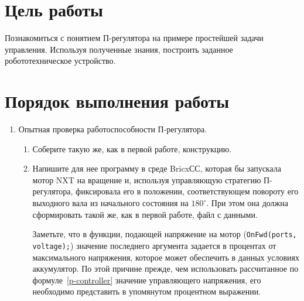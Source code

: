 \documentclass[12pt,a4paper,openany]{extarticle}
\begin{document}
\newpage				 
\section{Цель работы}
\hspace*{\parindent}Познакомиться с понятием П-регулятора на примере простейшей задачи управления.
Используя полученные знания, построить заданное робототехническое устройство.

\section{Порядок выполнения работы}
\begin{enumerate}
	\item Опытная проверка работоспособности П-регулятора.
	\begin{enumerate}
		\item Соберите такую же, как в первой работе, конструкцию.
		\item Напишите для нее программу в среде BricxСС, которая бы запускала мотор NXT на вращение и, используя управляющую стратегию П-регулятора, фиксировала его в положении, соответствующем повороту его выходного вала из начального состояния на $180^\circ$\!\!.
		При этом она должна сформировать такой же, как в первой работе, файл с данными.
		
		Заметьте, что в функции, подающей напряжение на мотор (\verb|OnFwd(ports, voltage);|) значение последнего аргумента задается в процентах от максимального напряжения, которое может обеспечить в данных условиях аккумулятор.
		По этой причине прежде, чем использовать рассчитанное по формуле~\eqref{p-controller} значение управляющего напряжения, его необходимо представить в упомянутом процентном выражении.
		

\end{enumerate}
\end{enumerate}
\end{document}
